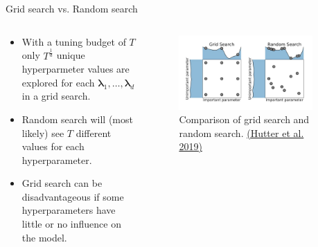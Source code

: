 \documentclass[11pt,compress,t,notes=noshow, xcolor=table]{beamer}
\begin{document}
\begin{vbframe}{Grid search vs. Random search}

\begin{columns}
  \begin{column}{0.49\textwidth}
    \begin{itemize}
      \item With a tuning budget of $T$ only $T^{\frac{1}{d}}$ unique hyperparmeter values are explored for each $\bm{\lambda}_1, \dots, \bm{\lambda}_d$ in a grid search.
      \item Random search will (most likely) see $T$ different values for each hyperparameter.
      \item Grid search can be disadvantageous if some hyperparameters have little or no influence on the model.
    \end{itemize}
  \end{column}
  
  \begin{column}{0.49\textwidth}
    \vspace*{-0.8cm}
    \begin{center}
      \begin{figure}
        \includegraphics[width=0.9\textwidth]{figure_man/rsvsgs.pdf}
        \caption*{Comparison of grid search and random search. \href{https://www.automl.org/wp-content/uploads/2019/05/AutoML\_Book.pdf}{(Hutter et al. 2019)}}
      \end{figure}
    \end{center}
  \end{column}
\end{columns}

\end{vbframe}
\end{document}
